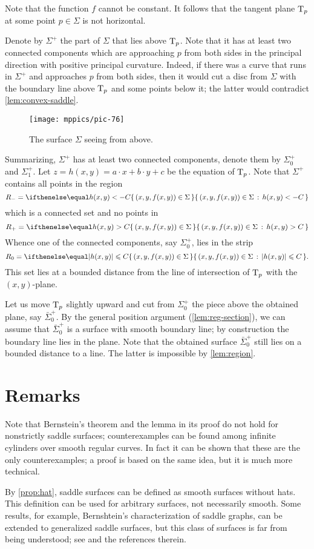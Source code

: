 Note that the function $f$ cannot be constant.
It follows that the tangent plane $\mathrm{T}_p$ at some point $p\in\Sigma$ is not horizontal.

Denote by $\Sigma^+$ the part of $\Sigma$ that lies above $\mathrm{T}_p$.
Note that it has at least two connected components which are approaching $p$ from both sides 
in the principal direction with positive principal curvature.
Indeed, if there was a curve that runs in $\Sigma^+$ and approaches $p$ from both sides, then it would cut a disc from $\Sigma$ with the boundary line above $\mathrm{T}_p$ and some points below it;
the latter would contradict \ref{lem:convex-saddle}.

\begin{figure}[!ht]
\vskip-0mm
\centering
\texttt{[image: mppics/pic-76]}
\caption*{The surface $\Sigma$ seeing from above.}
\vskip0mm
\end{figure}

Summarizing, $\Sigma^+$ has at least two connected components, denote them by $\Sigma^+_0$ and $\Sigma^+_1$.
Let $z=h(x,y)=a\cdot x+b\cdot y+c$ be the equation of $\mathrm{T}_p$.
Note that $\Sigma^+$ contains all points in the region
\[R_-=\set{(x,y,f(x,y))\in\Sigma}{h(x,y)< -C}\] 
which is a connected set and no points in 
\[R_+=\set{(x,y,f(x,y))\in\Sigma}{h(x,y)> C}\]
Whence one of the connected components, say $\Sigma^+_0$, lies in the strip
\[R_0=\set{(x,y,f(x,y))\in\Sigma}{|h(x,y)|\le  C}.\]
This set lies at a bounded distance from the line of intersection of $\mathrm{T}_p$ with the $(x,y)$-plane.

Let us move $\mathrm{T}_p$ slightly upward and cut from $\Sigma^+_0$ the piece above the obtained plane, say $\bar\Sigma^+_0$.
By the general position argument (\ref{lem:reg-section}),
we can assume that $\bar\Sigma^+_0$ is a surface with smooth boundary line;
by construction the boundary line lies in the plane.
Note that the obtained surface $\bar\Sigma^+_0$ still lies on a bounded distance to a line.
The latter is impossible by \ref{lem:region}.
\qeds

\section*{Remarks}

Note that Bernstein's theorem and the lemma in its proof do not hold for nonstrictly saddle surfaces;
counterexamples can be found among infinite cylinders over smooth regular curves.
In fact it can be shown that these are the only counterexamples;
a proof is based on the same idea, but it is much more technical.

By \ref{prop:hat}, saddle surfaces can be defined as smooth surfaces without hats.
This definition can be used for arbitrary surfaces, not necessarily smooth.
Some results, for example, Bernshtein's characterization of saddle graphs, can be extended to generalized saddle surfaces, but this class of surfaces is far from being understood; see \cite[Chapter 4]{alexander-kapovitch-petrunin2019} and the references therein.
